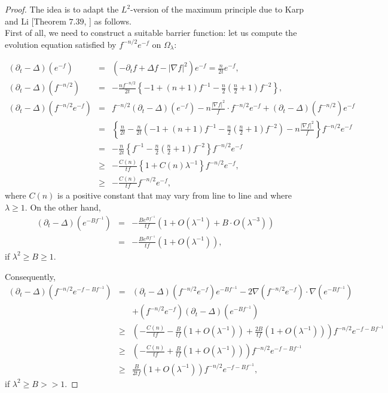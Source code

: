 \documentclass[a4paper,11pt,reqno]{amsart}
\begin{document}
\begin{proof}
The idea is to adapt the $L^2$-version of the maximum principle due to Karp and Li [Theorem $7.39$, \cite{Cho-Boo}] as follows.\\

First of all, we need to construct a suitable barrier function: let us compute the evolution equation satisfied by $f^{-n/2}e^{-f}$ on $\Omega_{\lambda}$:

\begin{eqnarray*}
(\partial_t-\Delta)(e^{-f})&=&\left(-\partial_tf+\Delta f-|\nabla f|^2\right)e^{-f}=\frac{n}{2t}e^{-f},\\
(\partial_t-\Delta)(f^{-n/2})&=&-\frac{n f^{-n/2}}{2t}\left\{-1+\left(n+1\right)f^{-1}-\frac{n}{2}\left(\frac{n}{2}+1\right)f^{-2}\right\},\\
(\partial_t-\Delta)\left(f^{-n/2}e^{-f}\right)&=&f^{-n/2}(\partial_t-\Delta)(e^{-f})-n\frac{|\nabla f|^2}{f}\cdot f^{-n/2}e^{-f}+(\partial_t-\Delta)(f^{-n/2})e^{-f}\\
&=&\left\{\frac{n}{2t}-\frac{n}{2t}\left(-1+\left(n+1\right)f^{-1}-\frac{n}{2}\left(\frac{n}{2}+1\right)f^{-2}\right)-n\frac{|\nabla f|^2}{f}\right\}f^{-n/2}e^{-f}\\
&=&-\frac{n}{2t}\left\{f^{-1}-\frac{n}{2}\left(\frac{n}{2}+1\right)f^{-2}\right\}f^{-n/2}e^{-f}\\
&\geq&-\frac{C(n)}{tf}\left\{1+C(n)\lambda^{-1}\right\}f^{-n/2}e^{-f},\\
&\geq&-\frac{C(n)}{tf}f^{-n/2}e^{-f},
\end{eqnarray*}
where $C(n)$ is a positive constant that may vary from line to line and where $\lambda\geq1.$
On the other hand,
\begin{eqnarray*}
(\partial_t-\Delta)\left(e^{-Bf^{-1}}\right)&=&-\frac{Be^{Bf^{-1}}}{tf}\left(1+\textit{O}(\lambda^{-1})+B\cdot\textit{O}(\lambda^{-3})\right)\\
&=&-\frac{Be^{Bf^{-1}}}{tf}\left(1+\textit{O}(\lambda^{-1})\right),
\end{eqnarray*}
if $\lambda^2\geq B\geq 1$.

Consequently,
\begin{eqnarray*}
\left(\partial_t-\Delta\right)\left(f^{-n/2}e^{-f-Bf^{-1}}\right)&=&\left(\partial_t-\Delta\right)\left(f^{-n/2}e^{-f}\right)e^{-Bf^{-1}}-2\nabla\left(f^{-n/2}e^{-f}\right)\cdot\nabla\left(e^{-Bf^{-1}}\right)\\
&&+\left(f^{-n/2}e^{-f}\right)\left(\partial_t-\Delta\right)\left(e^{-Bf^{-1}}\right)\\
&\geq&\left(-\frac{C(n)}{tf}-\frac{B}{tf}\left(1+\textit{O}(\lambda^{-1})\right)+\frac{2B}{tf}\left(1+\textit{O}(\lambda^{-1})\right)\right)f^{-n/2}e^{-f-Bf^{-1}}\\
&\geq&\left(-\frac{C(n)}{tf}+\frac{B}{tf}\left(1+\textit{O}(\lambda^{-1})\right)\right)f^{-n/2}e^{-f-Bf^{-1}}\\
&\geq&\frac{B}{2tf}\left(1+\textit{O}(\lambda^{-1})\right)f^{-n/2}e^{-f-Bf^{-1}},
\end{eqnarray*}
if $\lambda^2\geq B>>1.$


\end{proof}
\end{document}
